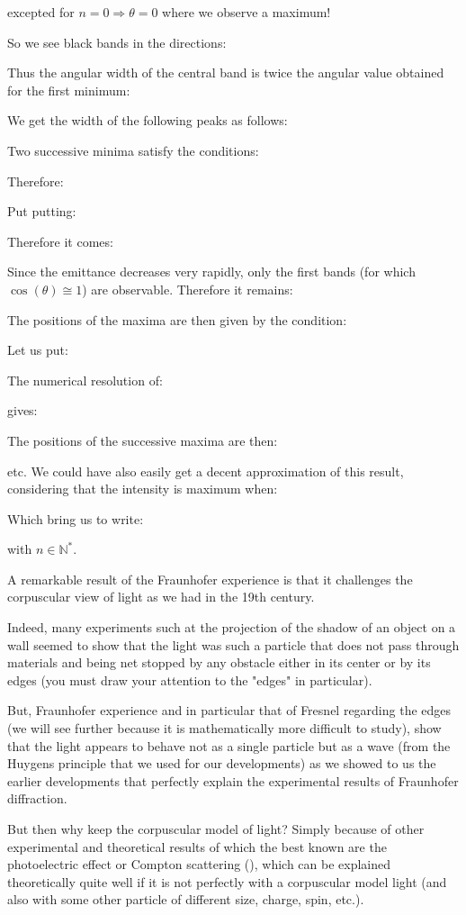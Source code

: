 	excepted for $n=0\Rightarrow \theta=0$ where we observe a maximum!
	
	So we see black bands in the directions:
	
	Thus the angular width of the central band  is twice the angular value obtained for the first minimum:
	
	We get the width of the following peaks as follows:

	Two successive minima satisfy the conditions:
	
	Therefore:
	
	Put putting:
	
	Therefore it comes:
	
	Since the emittance decreases very rapidly, only the first bands (for which $\cos(\theta)\cong 1$) are observable. Therefore it remains:
	
	The positions of the maxima are then given by the condition:
	
	Let us put:
	
	The numerical resolution of:
	
	gives:
	
	The positions of the successive maxima are then:
	
	etc.
	We could have also easily get a decent approximation of this result, considering that the intensity is maximum when:
	
	Which bring us to write:
	
	with $n\in \mathbb{N}^{*}$.
	
	A remarkable result of the Fraunhofer experience is that it challenges the corpuscular view of light as we had in the 19th century.

	Indeed, many experiments such at the projection of the shadow of an object on a wall seemed to show that the light was such a particle that does not pass through materials and being net stopped by any obstacle either in its center or by its edges (you must draw your attention to the "edges" in particular).

	But, Fraunhofer experience and in particular that of Fresnel regarding the edges (we will see further because it is mathematically more difficult to study), show that the light appears to behave not as a single particle but as a wave (from the Huygens principle that we used for our developments) as we showed to us the earlier developments that perfectly explain the experimental results of Fraunhofer diffraction.

	But then why keep the corpuscular model of light? Simply because of other experimental and theoretical results of which the best known are the photoelectric effect or Compton scattering (), which can be explained theoretically quite well if it is not perfectly with a corpuscular  model light (and also with some other particle of different size, charge, spin, etc.).
	
